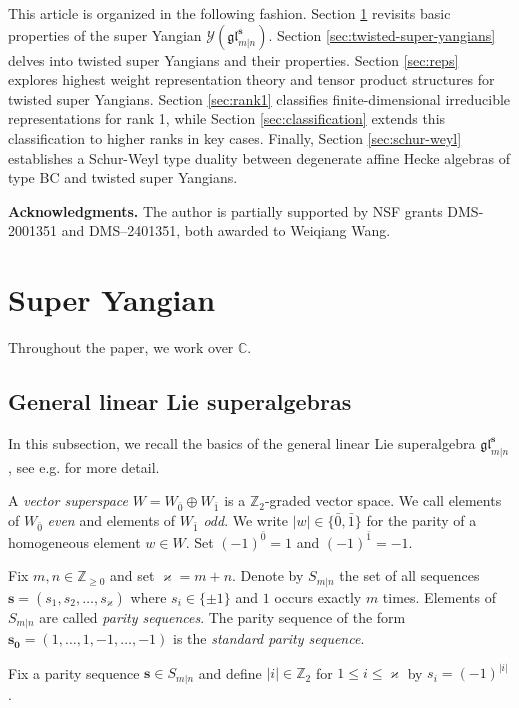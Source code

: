 \documentclass[11pt,reqno]{amsart}
\numberwithin{equation}{section}
\theoremstyle{definition}
\theoremstyle{remark}
\newcommand{\gl}{\mathfrak{gl}}
\newcommand{\bC}{\mathbb{C}}
\newcommand{\bZ}{\mathbb{Z}}
\newcommand{\gge}{\geqslant}
\newcommand{\lle}{\leqslant}
\newcommand{\glMN}{\mathfrak{gl}_{m|n}^{\bm s}}
\newcommand{\ka}{\varkappa}
\newcommand{\s}{{\bm s}}
\begin{document}
This article is organized in the following fashion. Section \ref{sec:super yangian} revisits basic properties of the super Yangian $\mathscr Y(\gl_{m|n}^\s)$. Section \ref{sec:twisted-super-yangians} delves into twisted super Yangians and their properties. Section \ref{sec:reps} explores highest weight representation theory and tensor product structures for twisted super Yangians. Section \ref{sec:rank1} classifies finite-dimensional irreducible representations for rank 1, while Section \ref{sec:classification} extends this classification to higher ranks in key cases. Finally, Section \ref{sec:schur-weyl} establishes a Schur-Weyl type duality between degenerate affine Hecke algebras of type BC and twisted super Yangians.

\medskip

{\bf Acknowledgments.} 
The author is partially supported by NSF grants DMS-2001351 and DMS--2401351, both awarded to Weiqiang Wang. 

\section{Super Yangian}\label{sec:super yangian}
Throughout the paper, we work over $\bC$.
\subsection{General linear Lie superalgebras}\label{sec glmn}
In this subsection, we recall the basics of the general linear Lie superalgebra $\glMN$, see e.g. \cite{Cheng2009dualities} for more detail.%

A \textit{vector superspace} $W = W_{\bar 0}\oplus W_{\bar 1}$ is a $\bZ_2$-graded vector space. We call elements of $W_{\bar 0}$ \textit{even} and elements of
$W_{\bar 1}$ \textit{odd}. We write $\vert w\vert \in\{\bar 0,\bar 1\}$ for the parity of a homogeneous element $w\in W$. Set $(-1)^{\bar 0}=1$ and $(-1)^{\bar 1}=-1$.

Fix $m,n\in \bZ_{\gge 0}$ and set $\ka=m+n$. Denote by $S_{m\vert n}$ the set of all sequences $\bm s=(s_{1},s_2,\dots,s_{\ka})$ where $s_i\in\{\pm1\}$ and $1$ occurs exactly $m$ times. Elements of $S_{m\vert n}$ are called \textit{parity sequences}. The parity sequence of the form $\bm{s_0}=(1,\dots,1,-1,\dots,-1)$ is the \textit{standard parity sequence}.

Fix a parity sequence $\s\in S_{m\vert n}$ and define $\vert i\vert \in \bZ_2$ for $1\lle i \lle \ka$ by $s_i=(-1)^{\vert i\vert }$.
\end{document}
